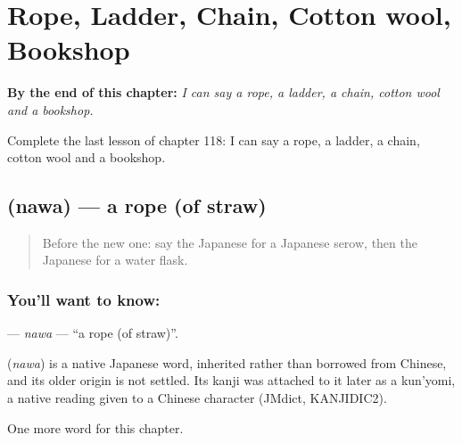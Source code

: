 
\chapter{Rope, Ladder, Chain, Cotton wool, Bookshop}
\label{ch:ja-rope-ladder-chain-cotton-wool-bookshop}

\begin{chapteropening}
\textbf{By the end of this chapter:} \emph{I can say a rope, a ladder, a chain, cotton wool and a bookshop.}

Complete the last lesson of chapter 118: I can say a rope, a ladder, a chain, cotton wool and a bookshop.
\end{chapteropening}

\section[\texorpdfstring{\ja{なわ} (nawa)}{なわ (nawa)}]{ (nawa) — a rope (of straw)}

\label{lesson:JA-C118-nawa}



\begin{quote}
Before the new one: say the Japanese for a Japanese serow, then the Japanese for a water flask.
\end{quote}

\subsection*{You'll want to know: }
\textbf{} — \emph{nawa} — \textquotedblleft{}a rope (of straw)\textquotedblright{}.

\begin{cousinweb}
\textbf{} (\emph{nawa}) is a native Japanese word, inherited rather than borrowed from Chinese, and its older origin is not settled. Its kanji was attached to it later as a kun'yomi, a native reading given to a Chinese character (JMdict, KANJIDIC2).
\end{cousinweb}

\begin{grammarlens}[title={What you've built}]
One more word for this chapter.
\end{grammarlens}

